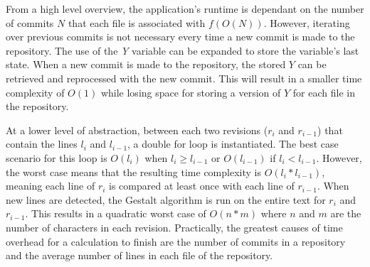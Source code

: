 From a high level overview, the application's runtime is dependant on the number of commits $N$ that each file is associated with $f(O(N))$. However, iterating over previous commits is not necessary every time a new commit is made to the repository. The use of the \textit{Y} variable can be expanded to store the variable's last state. When a new commit is made to the repository, the stored $Y$ can be retrieved and reprocessed with the new commit. This will result in a smaller time complexity of $O(1)$ while losing space for storing a version of $Y$ for each file in the repository.  

At a lower level of abstraction, between each two revisions ($r_i$ and $r_{i-1}$) that contain the lines $l_i$ and $l_{i-1}$, a double for loop is instantiated. The best case scenario for this loop is $O(l_i)$ when $l_i \geq l_{i-1}$ or $O(l_{i-1})$ if $l_i < l_{i-1}$. However, the worst case means that the resulting time complexity is $O(l_i * l_{i-1})$, meaning each line of $r_i$ is compared at least once with each line of $r_{i-1}$. When new lines are detected, the Gestalt algorithm is run on the entire text for $r_i$ and $r_{i-1}$. This results in a quadratic worst case of $O(n * m)$ where $n$ and $m$ are the number of characters in each revision. Practically, the greatest causes of time overhead for a calculation to finish are the number of commits in a repository and the average number of lines in each file of the repository.